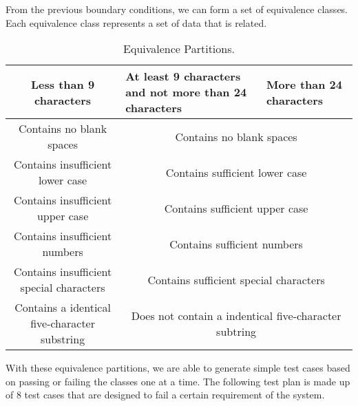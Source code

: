 \documentclass[12pt,letterpaper]{article}
\begin{document}
From the previous boundary conditions, we can form a set of equivalence classes. Each equivalence
class represents a set of data that is related.
\begin{table}[h!]
  \begin{center}
    \caption{Equivalence Partitions.}
    \label{tab:Equiv partitions}
    
    \begin{tabular}{||c|m{4cm}|m{5cm}||}
    \hline
    Less than 9 characters & At least 9 characters and not more than 24
    characters & More than 24 characters \\
    
    \hline \hline
    \multicolumn{1}{||c|}{Contains no blank spaces} & \multicolumn{2}{c||}{Contains no blank spaces} \\
    
    \hline \hline
    \multicolumn{1}{||c|}{Contains insufficient lower case} 
    & \multicolumn{2}{c||}{Contains sufficient lower case} \\
    
    \hline \hline
    \multicolumn{1}{||c|}{Contains insufficient upper case} 
    & \multicolumn{2}{c||}{Contains sufficient upper case} \\
    
    \hline \hline
    \multicolumn{1}{||c|}{Contains insufficient numbers} 
    & \multicolumn{2}{c||}{Contains sufficient numbers} \\
    
    \hline \hline
    \multicolumn{1}{||c|}{Contains insufficient special characters} 
    & \multicolumn{2}{c||}{Contains sufficient special characters} \\
    
    \hline \hline
    \multicolumn{1}{||c|}{Contains a identical five-character substring}
    & \multicolumn{2}{c||}{Does not contain a indentical five-character subtring} \\
    \hline
    \end{tabular}
  \end{center}
\end{table}

With these equivalence partitions, we are able to generate simple test cases
based on passing or failing the classes one at a time. The following test plan
is made up of 8 test cases that are designed to fail a certain requirement of
the system.
\newline
\end{document}
